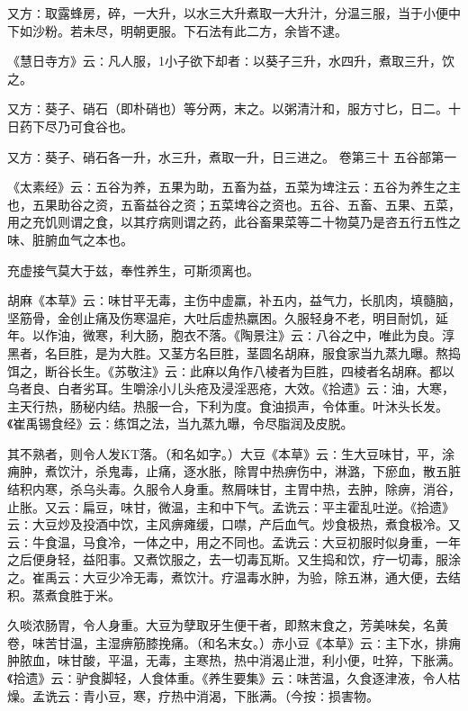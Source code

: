 \documentclass[a4paper,12pt,UTF8,twoside]{ctexbook}
\begin{document}
又方∶取露蜂房，碎，一大升，以水三大升煮取一大升汁，分温三服，当于小便中下如沙粉。若未尽，明朝更服。下石法有此二方，余皆不逮。

《慧日寺方》云∶凡人服，1小子欲下却者∶以葵子三升，水四升，煮取三升，饮之。

又方∶葵子、硝石（即朴硝也）等分两，末之。以粥清汁和，服方寸匕，日二。十日药下尽乃可食谷也。

又方∶葵子、硝石各一升，水三升，煮取一升，日三进之。
卷第三十
五谷部第一

《太素经》云∶五谷为养，五果为助，五畜为益，五菜为埤注云∶五谷为养生之主也，五果助谷之资，五畜益谷之资；五菜埤谷之资也。五谷、五畜、五果、五菜，用之充饥则谓之食，以其疗病则谓之药，此谷畜果菜等二十物莫乃是咨五行五性之味、脏腑血气之本也。

充虚接气莫大于兹，奉性养生，可斯须离也。

胡麻《本草》云∶味甘平无毒，主伤中虚羸，补五内，益气力，长肌肉，填髓脑，坚筋骨，金创止痛及伤寒温疟，大吐后虚热羸困。久服轻身不老，明目耐饥，延年。以作油，微寒，利大肠，胞衣不落。《陶景注》云∶八谷之中，唯此为良。淳黑者，名巨胜，是为大胜。又茎方名巨胜，茎圆名胡麻，服食家当九蒸九曝。熬捣饵之，断谷长生。《苏敬注》云∶此麻以角作八棱者为巨胜，四棱者名胡麻。都以乌者良、白者劣耳。生嚼涂小儿头疮及浸淫恶疮，大效。《拾遗》云∶油，大寒，主天行热，肠秘内结。热服一合，下利为度。食油损声，令体重。叶沐头长发。《崔禹锡食经》云∶练饵之法，当九蒸九曝，令尽脂润及皮脱。

其不熟者，则令人发KT落。（和名如字。）大豆《本草》云∶生大豆味甘，平，涂痈肿，煮饮汁，杀鬼毒，止痛，逐水胀，除胃中热痹伤中，淋潞，下瘀血，散五脏结积内寒，杀乌头毒。久服令人身重。熬屑味甘，主胃中热，去肿，除痹，消谷，止胀。又云∶扁豆，味甘，微温，主和中下气。孟诜云∶平主霍乱吐逆。《拾遗》云∶大豆炒及投酒中饮，主风痹瘫缓，口噤，产后血气。炒食极热，煮食极冷。又云∶牛食温，马食冷，一体之中，用之不同也。孟诜云∶大豆初服时似身重，一年之后便身轻，益阳事。又煮饮服之，去一切毒瓦斯。又生捣和饮，疗一切毒，服涂之。崔禹云∶大豆少冷无毒，煮饮汁。疗温毒水肿，为验，除五淋，通大便，去结积。蒸煮食胜于米。

久啖浓肠胃，令人身重。大豆为孽取牙生便干者，即熬末食之，芳美味矣，名黄卷，味苦甘温，主湿痹筋膝挽痛。（和名末女。）赤小豆《本草》云∶主下水，排痈肿脓血，味甘酸，平温，无毒，主寒热，热中消渴止泄，利小便，吐猝，下胀满。《拾遗》云∶驴食脚轻，人食体重。《养生要集》云∶味苦温，久食逐津液，令人枯燥。孟诜云∶青小豆，寒，疗热中消渴，下胀满。（今按∶损害物。
\end{document}
